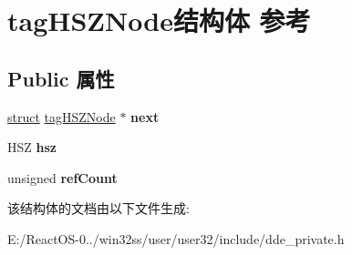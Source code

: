 \hypertarget{structtag_h_s_z_node}{}\section{tag\+H\+S\+Z\+Node结构体 参考}
\label{structtag_h_s_z_node}
\subsection*{Public 属性}
\begin{DoxyCompactItemize}
\item 
\mbox{\label{structtag_h_s_z_node_a6d9116c2f97477d5cda02be70c25c8a9}} 
\hyperlink{interfacestruct}{struct} \hyperlink{structtag_h_s_z_node}{tag\+H\+S\+Z\+Node} $\ast$ {\bfseries next}
\item 
\mbox{\label{structtag_h_s_z_node_a199a06be02ca4ba9dc6713dcc1170556}} 
H\+SZ {\bfseries hsz}
\item 
\mbox{\label{structtag_h_s_z_node_ae29dcf920bf9d6ccf6690b1c6c5fcaa6}} 
unsigned {\bfseries ref\+Count}
\end{DoxyCompactItemize}


该结构体的文档由以下文件生成\+:\begin{DoxyCompactItemize}
\item 
E\+:/\+React\+O\+S-\/0../win32ss/user/user32/include/dde\+\_\+private.\+h\end{DoxyCompactItemize}
